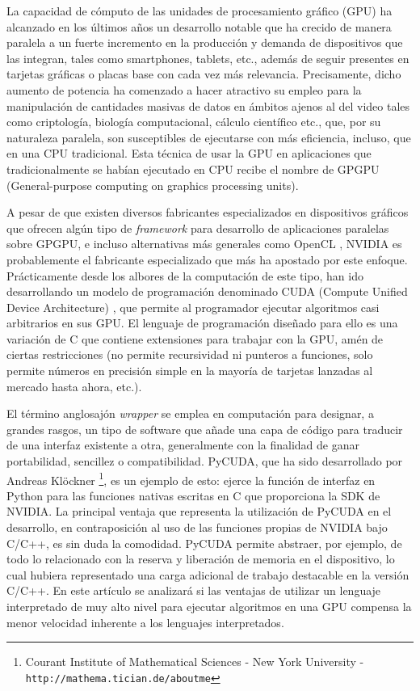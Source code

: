 \documentclass[twocolumn,twoside]{Jornadas}
\begin{document}
La capacidad de cómputo de las unidades de procesamiento gráfico (GPU) ha alcanzado en los últimos años un desarrollo notable que ha crecido de manera paralela a un fuerte incremento en la producción y demanda de dispositivos que las integran, tales como smartphones, tablets, etc., además de seguir presentes en tarjetas gráficas o placas base con cada vez más relevancia. Precisamente, dicho aumento de potencia ha comenzado a hacer atractivo su empleo para la manipulación de cantidades masivas de datos en ámbitos ajenos al del video tales como criptología, biología computacional, cálculo científico etc., que, por su naturaleza paralela, son susceptibles de ejecutarse con más eficiencia, incluso, que en una CPU tradicional. Esta técnica de usar la GPU en aplicaciones que tradicionalmente se habían ejecutado en CPU recibe el nombre de GPGPU (General-purpose computing on graphics processing units).

\vspace{5 mm}

A pesar de que existen diversos fabricantes especializados en dispositivos gráficos que ofrecen algún tipo de \emph{framework} para desarrollo de aplicaciones paralelas sobre GPGPU, e incluso alternativas más generales como OpenCL \cite{opencl}, NVIDIA es probablemente el fabricante especializado que más ha apostado por este enfoque. Prácticamente desde los albores de la computación de este tipo, han ido desarrollando un modelo de programación denominado CUDA (Compute Unified Device Architecture) \cite{aboutcuda}, que permite al programador ejecutar algoritmos casi arbitrarios en sus GPU. El lenguaje de programación diseñado para ello es una variación de C que contiene extensiones para trabajar con la GPU, amén de ciertas restricciones (no permite recursividad ni punteros a funciones, solo permite números en precisión simple en la mayoría de tarjetas lanzadas al mercado hasta ahora, etc.).

\vspace{5 mm}

El término anglosajón \emph{wrapper} se emplea en computación para designar, a grandes rasgos, un tipo de software que añade una capa de código para traducir de una interfaz existente a otra, generalmente con la finalidad de ganar portabilidad, sencillez o compatibilidad. PyCUDA, que ha sido desarrollado por Andreas Klöckner \footnote[2]{Courant Institute of Mathematical Sciences - New York University - {\tt http://mathema.tician.de/aboutme}}, es un ejemplo de esto: ejerce la función de interfaz en Python para las funciones nativas escritas en C que proporciona la SDK de NVIDIA. La principal ventaja que representa la utilización de PyCUDA en el desarrollo, en contraposición al uso de las funciones propias de NVIDIA bajo C/C++, es sin duda la comodidad. PyCUDA permite abstraer, por ejemplo, de todo lo relacionado con la reserva y liberación de memoria en el dispositivo, lo cual hubiera representado una carga adicional de trabajo destacable en la versión C/C++. En este artículo se analizará si las ventajas de utilizar un lenguaje interpretado de muy alto nivel para ejecutar algoritmos en una GPU compensa la menor velocidad inherente a los lenguajes interpretados.
\end{document}
